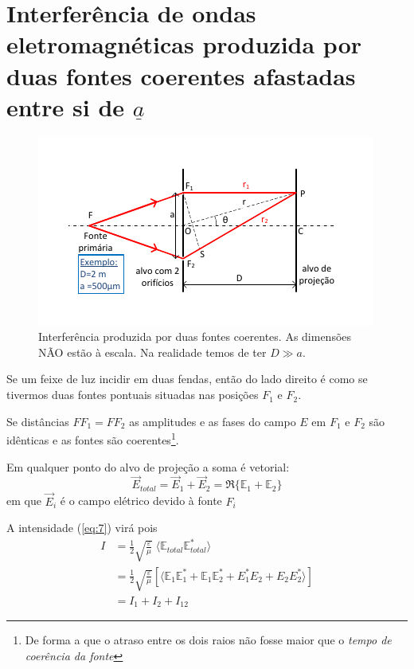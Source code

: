 \documentclass[a4paper,12pt]{article}
\begin{document}
\section{\sf Interferência de ondas eletromagnéticas produzida por duas fontes coerentes afastadas entre si de $\underline{a}$ }
\begin{figure}[h!tb]
	\centering 
	\includegraphics[width=0.8
	\textwidth]{interf} \caption{Interferência produzida por duas fontes coerentes. As dimensões NÃO estão à escala. Na realidade temos de ter $D \gg a$. \label{fig:1}} 
\end{figure}

Se um feixe de luz incidir em duas fendas, então do lado direito é como se tivermos duas fontes pontuais situadas nas posições $F_1$ e $F_2$.

Se distâncias $F F_1 = F F_2$ as amplitudes e as fases do campo $E$ em $F_1$ e $F_2$ são idênticas e as fontes são coerentes\footnote{De forma a que o atraso entre os dois raios não fosse maior que o \emph{tempo de coerência da fonte}}.

Em qualquer ponto do alvo de projeção a soma é vetorial: 
\begin{equation}
	\label{eq:8} \vec{E}_{total} = \vec{E}_1 + \vec{E}_2  = \Re \{ \mathbb{E}_1 + \mathbb{E}_2 \} 
\end{equation}
em que $\vec{E}_i$ é o campo elétrico devido à fonte $F_i$

A intensidade (\ref{eq:7}) virá pois 
\begin{align}
	I &= \frac{1}{2}\sqrt{\frac{ \varepsilon}{\mu}} \; \langle \mathbb{E}_{total} \mathbb{E}^*_{total} \rangle \nonumber \\
	&= \frac{1}{2}\sqrt{\frac{ \varepsilon}{\mu}} \left[ \langle \mathbb{E}_1 \mathbb{E}^*_1 + \mathbb{E}_1 \mathbb{E}^*_2 + E^*_1 E_2 + E_2 E^*_2 \rangle \right] \nonumber \\
	&= I_1 + I_2 +I_{12} 
\end{align}
\end{document}

